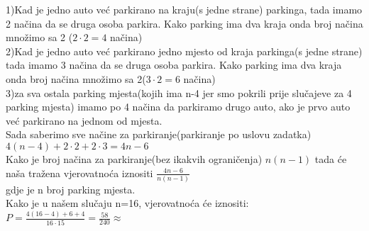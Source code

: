 \documentclass[12pt]{article}
\begin{document}
\begin{enumerate}
\begin{center}
{		1)Kad je jedno auto već parkirano na kraju(s jedne strane) parkinga, tada imamo 2 načina da se druga osoba parkira. Kako parking ima dva kraja onda broj načina množimo sa 2 ($2\cdot2 = 4$ načina)\\
		\vspace{0.15cm}
		2)Kad je jedno auto već parkirano jedno mjesto od kraja parkinga(s jedne strane) tada imamo 3 načina da se druga osoba parkira. Kako parking ima dva kraja onda broj načina množimo sa 2($3\cdot2 = 6$ načina)\\
		\vspace{0.15cm}
		3)za sva ostala parking mjesta(kojih ima n-4 jer smo pokrili prije slučajeve za 4 parking mjesta) imamo po 4 načina da parkiramo drugo auto, ako je prvo auto već parkirano na jednom od mjesta.
		\\ \vspace{0.30cm}
		Sada saberimo sve načine za parkiranje(parkiranje po uslovu zadatka)
		\\
		$4(n-4) + 2\cdot2 + 2\cdot3 = 4n - 6$
		\\ \vspace{0.15cm}
		Kako je broj načina za parkiranje(bez ikakvih ograničenja) $n(n-1)$ tada će naša tražena vjerovatnoća iznositi $\frac{4n-6}{n(n-1)}$ \\gdje je n broj parking mjesta.\\ Kako je u našem slučaju n=16, vjerovatnoća će iznositi:\\
		\vspace{0.15cm}
		$P = \frac{4(16-4)+6+4}{16\cdot15} = \frac{58}{240} \approx $  
		}
		

\end{center}
\end{enumerate}
\end{document}
